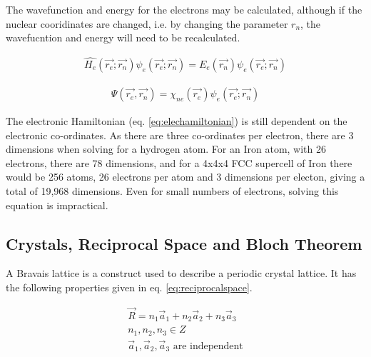 The wavefunction and energy for the electrons may be calculated, although if the nuclear cooridinates are changed, i.e. by changing the parameter $r_n$, the wavefucntion and energy will need to be recalculated.

\begin{equation}
\begin{split}
\hat{H_e} (\vec{r_e}; \vec{r_n}) \psi_{e} (\vec{r_e}; \vec{r_n}) = E_e (\vec{r_n})  \psi_{e} (\vec{r_e}; \vec{r_n}) 
\end{split}
\label{eq:elechamiltonian}
\end{equation}


\begin{equation}
\begin{split}
\Psi (\vec{r_e}, \vec{r_n}) = \chi_{ne} (\vec{r_e}) \psi_{e} (\vec{r_e}; \vec{r_n})
\end{split}
\label{eq:combinedwavefunction}
\end{equation}

The electronic Hamiltonian (eq. \ref{eq:elechamiltonian}) is still dependent on the electronic co-ordinates.  As there are three co-ordinates per electron, there are 3 dimensions when solving for a hydrogen atom.  For an Iron atom, with 26 electrons, there are 78 dimensions, and for a 4x4x4 FCC supercell of Iron there would be 256 atoms, 26 electrons per atom and 3 dimensions per electon, giving a total of 19,968 dimensions.  Even for small numbers of electrons, solving this equation is impractical.




\subsection{Crystals, Reciprocal Space and Bloch Theorem}
\label{section:crystalsrecipbloch}

A Bravais lattice is a construct used to describe a periodic crystal lattice.  It has the following properties given in eq. \ref{eq:reciprocalspace}. 

\begin{equation}
  \begin{split}
    \vec{R} = n_1 \vec{a}_1 + n_2 \vec{a}_2 + n_3 \vec{a}_3 \\
    n_1 , n_2, n_3 \in Z \\
    \vec{a}_1, \vec{a}_2, \vec{a}_3 \text{ are independent}
  \end{split}
  \label{eq:reciprocalspace}
\end{equation}

